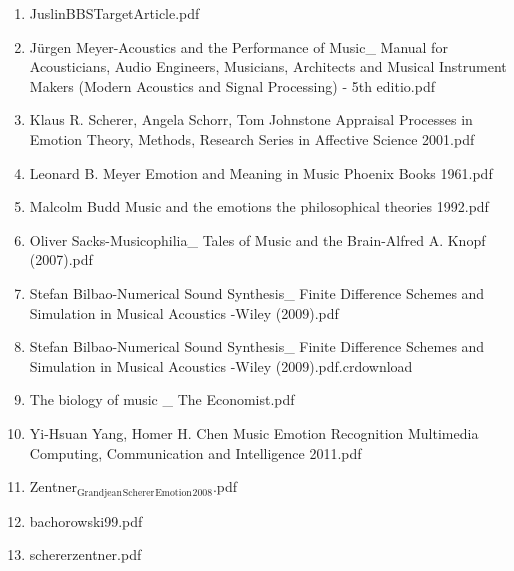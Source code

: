 \documentclass[11pt]{article}
\begin{document}
\begin{enumerate}
\item JuslinBBSTargetArticle.pdf
\label{sec-1-1-1-1-30-14}

\item Jürgen Meyer-Acoustics and the Performance of Music\_ Manual for Acousticians, Audio Engineers, Musicians, Architects and Musical Instrument Makers (Modern Acoustics and Signal Processing) - 5th editio.pdf
\label{sec-1-1-1-1-30-15}

\item Klaus R. Scherer, Angela Schorr, Tom Johnstone Appraisal Processes in Emotion Theory, Methods, Research Series in Affective Science  2001.pdf
\label{sec-1-1-1-1-30-16}

\item Leonard B. Meyer Emotion and Meaning in Music Phoenix Books    1961.pdf
\label{sec-1-1-1-1-30-17}

\item Malcolm Budd Music and the emotions the philosophical theories  1992.pdf
\label{sec-1-1-1-1-30-18}

\item Oliver Sacks-Musicophilia\_ Tales of Music and the Brain-Alfred A. Knopf (2007).pdf
\label{sec-1-1-1-1-30-19}

\item Stefan Bilbao-Numerical Sound Synthesis\_ Finite Difference Schemes and Simulation in Musical Acoustics    -Wiley (2009).pdf
\label{sec-1-1-1-1-30-20}

\item Stefan Bilbao-Numerical Sound Synthesis\_ Finite Difference Schemes and Simulation in Musical Acoustics    -Wiley (2009).pdf.crdownload
\label{sec-1-1-1-1-30-21}

\item The biology of music \_ The Economist.pdf
\label{sec-1-1-1-1-30-22}

\item Yi-Hsuan Yang, Homer H. Chen Music Emotion Recognition Multimedia Computing, Communication and Intelligence    2011.pdf
\label{sec-1-1-1-1-30-23}

\item Zentner$_{\text{Grandjean}}$$_{\text{Scherer}}$$_{\text{Emotion}}$$_{\text{2008}}$.pdf
\label{sec-1-1-1-1-30-24}

\item bachorowski99.pdf
\label{sec-1-1-1-1-30-25}

\item schererzentner.pdf
\label{sec-1-1-1-1-30-26}


\end{enumerate}
\end{document}
